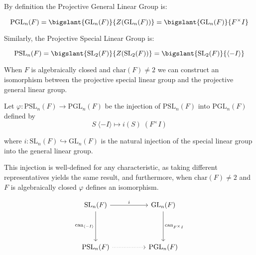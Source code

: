 By definition the Projective General Linear Group is:

\begin{equation}
    \textrm{PGL}_n(F) = \bigslant{\textrm{GL}_n(F)}{Z(\textrm{GL}_n(F))} = \bigslant{\text{GL}_n(F)}{F^\times I}
\end{equation}

Similarly, the Projective Special Linear Group is:

\begin{equation}
    \textrm{PSL}_n(F) = \bigslant{\textrm{SL}_2(F)}{Z(\textrm{SL}_2(F))} = \bigslant{\textrm{SL}_2(F)}{\langle -I\rangle}
\end{equation}



When $F$ is algebraically closed and $\textrm{char}(F) \neq 2$ we can construct an isomorphism between the projective special linear group and the projective general linear group.

Let $\varphi : \textrm{PSL}_n(F) \rightarrow \textrm{PGL}_n(F)$ be the injection of $\textrm{PSL}_n(F)$ into $\textrm{PGL}_n(F)$ defined by
\[
 S \; \langle -I\rangle \mapsto i(S) \;  (F^\times I) 
\]

where $i : \textrm{SL}_n(F) \hookrightarrow \textrm{GL}_n(F)$ is the natural injection of the special linear group into the general linear group.

This injection is well-defined for any characteristic, as taking different representatives yields the same result, and furthermore, when $\textrm{char}(F) \ne 2$ and $F$ is algebraically closed $\varphi$ defines an isomorphism.

\[\begin{tikzcd}
	{\textrm{SL}_n(F)} && {\textrm{GL}_n(F)} \\
	&& {} \\
	{\textrm{PSL}_n(F)} && {\textrm{PGL}_n(F)}
	\arrow["i", from=1-1, to=1-3]
	\arrow["{\textrm{can}_{\langle-I\rangle}}"', from=1-1, to=3-1]
	\arrow["{\textrm{can}_{F^\times I}}", from=1-3, to=3-3]
	\arrow[dotted, from=3-1, to=3-3]
\end{tikzcd}\]

